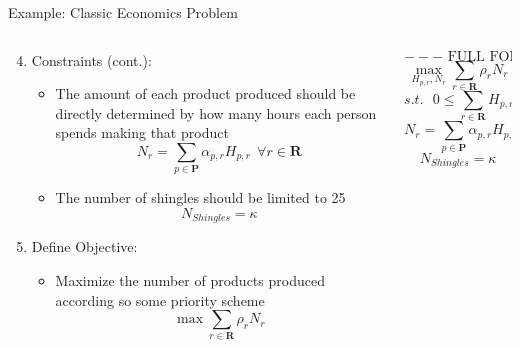 \documentclass[10pt, aspectratio=169]{beamer}
\begin{document}
\begin{frame}{Example: Classic Economics Problem}
    \begin{columns}
        \begin{column}{0.5\textwidth}
            \vspace{-0.2cm}
            \begin{enumerate}
                \setcounter{enumi}{3}
                \item Constraints (cont.):
                \begin{itemize}
                    \item The amount of each product produced should be directly determined by how many hours each person spends making that product
                    $$N_r = \sum_{p \in \textbf{P}} \alpha_{p,r}H_{p,r} \ \ \forall r \in \textbf{R}$$
                    \item The number of shingles should be limited to 25
                    $$N_{Shingles} = \kappa$$
                \end{itemize}

                \item Define Objective:
                \begin{itemize}
                    \item Maximize the number of products produced according so some priority scheme
                    $$\max \sum_{r \in \textbf{R}} \rho_r N_r$$
                \end{itemize}

            \end{enumerate}
        \end{column}
        \begin{column}{0.5\textwidth}
            $$---\text{ FULL FORMULATION }---$$
            $$\max_{H_{p,r},N_r} \sum_{r \in \textbf{R}} \rho_r N_r$$
            $$s.t.\ \ \ 0 \leq \sum_{r \in \textbf{R}} H_{p,r} \leq \tau^{DAY} \ \ \forall p \in \textbf{P}$$
            $$N_r = \sum_{p \in \textbf{P}} \alpha_{p,r}H_{p,r} \ \ \forall r \in \textbf{R}$$
            $$N_{Shingles} = \kappa$$

        \end{column}
    \end{columns}
\end{frame}
\end{document}
